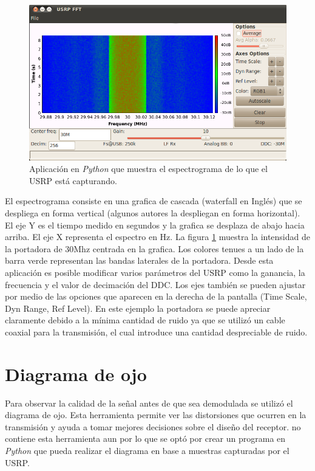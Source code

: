 \begin{figure}[htp]
  \centering
  \includegraphics[scale=0.7]{figs/spectrogramgui}
  \vspace{0.3in}
  \caption{Aplicaci\'on en \emph{Python} que muestra el espectrograma de lo que el USRP est\'a capturando.}
  \label{fig:spectrogramgui}
\end{figure}

El espectrograma consiste en una grafica de cascada (waterfall en Ingl\'es) que se despliega en
forma vertical (algunos autores la despliegan en forma horizontal). El eje Y es el tiempo medido en
segundos y la grafica se desplaza de abajo hacia arriba. El eje X representa el espectro en Hz. La
figura \ref{fig:spectrogramgui} muestra la intensidad de la portadora de 30Mhz centrada en la
grafica. Los colores tenues a un lado de la barra verde representan las bandas laterales de la
portadora. Desde esta aplicaci\'on es posible modificar varios par\'ametros del USRP como la
ganancia, la frecuencia y el valor de decimaci\'on del DDC. Los ejes tambi\'en se pueden ajustar por
medio de las opciones que aparecen en la derecha de la pantalla (Time Scale, Dyn Range, Ref Level).
En este ejemplo la portadora se puede apreciar claramente debido a la m\'inima cantidad de ruido ya que se
utiliz\'o un cable coaxial para la transmisi\'on, el cual introduce una cantidad despreciable de ruido.

\section{Diagrama de ojo}

Para observar la calidad de la se\~nal antes de que sea demodulada se utiliz\'o el diagrama de
ojo. Esta herramienta permite ver las distorsiones que ocurren en la transmisi\'on y ayuda a
tomar mejores decisiones sobre el dise\~no del receptor. \gnuradio no contiene esta
herramienta aun por lo que se opt\'o por crear un programa en \emph{Python} que pueda realizar el diagrama en
base a muestras capturadas por el USRP.


